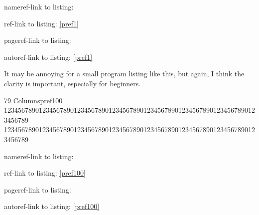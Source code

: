\documentclass{article}
\begin{document}
nameref-link to listing: 

ref-link to listing: \ref{pref1}

pageref-link to listing: \pageref{pref1}

autoref-link to listing: \autoref{pref1}

It may be annoying for a small program listing like this, but again, I think the clarity is 
important, especially for beginners. 

\begin{glowscriptblock}{79 Columns}{pref100}
1234567890123456789012345678901234567890123456789012345678901234567890123456789
1234567890123456789012345678901234567890123456789012345678901234567890123456789
\end{glowscriptblock}

nameref-link to listing: 

ref-link to listing: \ref{pref100}

pageref-link to listing: \pageref{pref100}

autoref-link to listing: \autoref{pref100}
\end{document}
